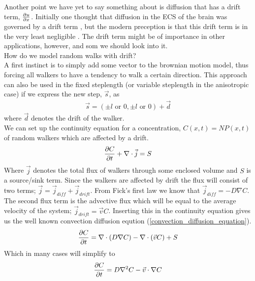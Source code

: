 Another point we have yet to say something about is diffusion that has a drift term, $\frac{\partial u}{\partial x}$. 
Initially one thought that diffusion in the ECS of the brain was governed by a drift term , but the modern preception is that this drift term is in the very least negligible \cite{nicholson2001diffusion}.
The drift term might be of importance in other applications, however, and som we should look into it.\\
How do we model random walks with drift? \\
A first instinct is to simply add some vector to the brownian motion model, thus forcing all walkers to have a tendency to walk a certain direction. 
This approach can also be used in the fixed steplength (or variable steplength in the anisotropic case)  if we express the new step, $\vec{s}$, as
\begin{align*}
 \vec{s} = (\pm l \text{ or }0,\pm l \text{ or }0) +\vec{d}
\end{align*}
where $\vec{d}$ denotes the drift of the walker.\\
We can set up the continuity equation for a concentration, $C(x,t) = NP(x,t)$ of random walkers which are affected by a drift.
\begin{equation}
 \frac{\partial C}{\partial t} +\nabla\cdot\vec{j} = S
\end{equation}
Where $\vec{j}$ denotes the total flux of walkers through some enclosed volume and $S$ is a source/sink term. 
Since the walkers are affected by drift the flux will consist of two terms; $\vec{j} = \vec{j}_{diff}+\vec{j}_{drift}$. 
From Fick's first law we know that $\vec{j}_{diff} = -D\nabla C$. 
The second flux term is the advective flux which will be equal to the average velocity of the system; $\vec{j}_{drift} = \vec{v}C$. 
Inserting this in the continuity equation gives us the well known convection diffusion eqution (\ref{convection_diffusion_equation}).
\begin{equation}\label{convection_diffusion_equation}
 \frac{\partial C}{\partial t} = \nabla\cdot\left(D\nabla C\right)-\nabla\cdot\left(\vec{v}C\right) + S
\end{equation}
Which in many cases will simplify to
\begin{equation}
 \frac{\partial C}{\partial t} = D\nabla^2 C-\vec{v}\cdot\nabla C
\end{equation}


